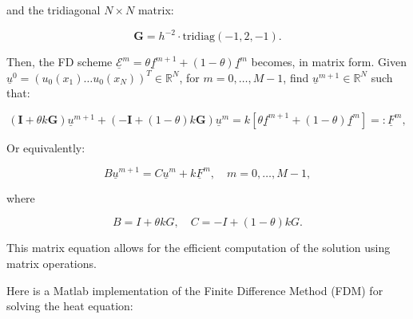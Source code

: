 and the tridiagonal $N \times N$ matrix:

\[
\textbf{G} = h^{-2} \cdot \text{tridiag}(-1, 2, -1).
\]

Then, the FD scheme $\underline{\mathcal{E}}^{m} = \theta \underline{f}^{m+1} + (1 - \theta) \underline{f}^{m}$ becomes, in matrix form. Given $\underline{u}^{0} = (u_{0}(x_{1}) \hdots u_{0}(x_{N}))^T  \in \mathbb{R}^{N}$, for $m = 0, \ldots, M-1$, find $\underline{u}^{m+1} \in \mathbb{R}^{N}$ such that:

\[
(\textbf{I} + \theta k \textbf{G}) \underline{u}^{m+1} + (-\textbf{I} + (1 - \theta) k \textbf{G}) \underline{u}^{m} = k [\theta \underline{f}^{m+1} + (1 - \theta) \underline{f}^{m}] =: \underline{F}^{m},
\]

Or equivalently:

\[
B \underline{u}^{m+1} = C \underline{u}^{m} + k \underline{F}^{m}, \quad m = 0, \ldots, M-1,
\]

where

\[
B = I + \theta kG, \quad C = -I + (1 - \theta) kG.
\]

This matrix equation allows for the efficient computation of the solution using matrix operations.


Here is a Matlab implementation of the Finite Difference Method (FDM) for solving the heat equation:

